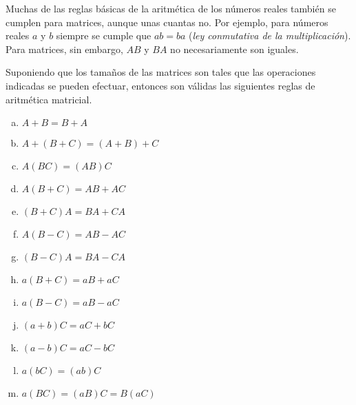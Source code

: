 \documentclass[a4paper,12pt]{article}
\begin{document}
Muchas de las reglas básicas de la aritmética de los números reales también se
cumplen para matrices, aunque unas cuantas no. Por ejemplo, para números
reales $a$ y $b$ siempre se cumple que $ab=ba$ (\emph{ley conmutativa de la
multiplicación}). Para matrices, sin embargo, $AB$ y $BA$ no necesariamente
son iguales.
\begin{theorem}
  Suponiendo que los tamaños de las matrices son tales que las operaciones
  indicadas se pueden efectuar, entonces son válidas las siguientes reglas de
  aritmética matricial.

  \begin{enumerate}[(a)]
    \item $A+B=B+A$ \hfill {}
    \item $A+(B+C)=(A+B)+C$ \hfill {}
    \item $A(BC)=(AB)C$ \hfill {}
    \item $A(B+C)=AB+AC$ \hfill {}
    \item $(B+C)A=BA+CA$ \hfill {}
    \item $A(B-C)=AB-AC$
    \item $(B-C)A=BA-CA$
    \item $a(B+C)=aB+aC$
    \item $a(B-C)=aB-aC$
    \item $(a+b)C=aC+bC$
    \item $(a-b)C=aC-bC$
    \item $a(bC)=(ab)C$
    \item $a(BC)=(aB)C=B(aC)$
  \end{enumerate}
  \label{theo:aritmat}
\end{theorem}
\end{document}
